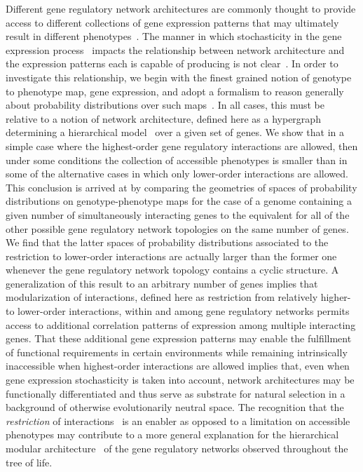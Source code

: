 Different gene regulatory network architectures are commonly thought to provide access to different collections of gene expression patterns that may ultimately result in different phenotypes~\cite{Alon2007}. The manner in which stochasticity in the gene expression process~\cite{Eldar2010,Sanchez2013} impacts the relationship between network architecture and the expression patterns each is capable of producing is not clear~\cite{Jothi2009,Chalancon2012}. In order to investigate this relationship, we begin with the finest grained notion of genotype to phenotype map, gene expression, and adopt a formalism to reason generally about probability distributions over such maps~\cite{Lane1998,MacLane1992,Awodey2006,Abramsky2011}. In all cases, this must be relative to a notion of network architecture, defined here as a hypergraph determining a hierarchical model~\cite{Lauritzen1996} over a given set of genes. We show that in a simple case where the highest-order gene regulatory interactions are allowed, then under some conditions the collection of accessible phenotypes is smaller than in some of the alternative cases in which only lower-order interactions are allowed. This conclusion is arrived at by comparing the geometries of spaces of probability distributions on genotype-phenotype maps for the case of a genome containing a given number of simultaneously interacting genes to the equivalent for all of the other possible gene regulatory network topologies on the same number of genes. We find that the latter spaces of probability distributions associated to the restriction to lower-order interactions are actually larger than the former one whenever the gene regulatory network topology contains a cyclic structure. A generalization of this result to an arbitrary number of genes implies that modularization of interactions, defined here as restriction from relatively higher- to lower-order interactions, within and among gene regulatory networks permits access to additional correlation patterns of expression among multiple interacting genes. That these additional gene expression patterns may enable the fulfillment of functional requirements in certain environments while remaining intrinsically inaccessible when highest-order interactions are allowed implies that, even when gene expression stochasticity is taken into account, network architectures may be functionally differentiated and thus serve as substrate for natural selection in a background of otherwise evolutionarily neutral space. The recognition that the \emph{restriction} of interactions~\cite{Bar-Even2006,Johnson2010a} is an enabler as opposed to a limitation on accessible phenotypes may contribute to a more general explanation for the hierarchical modular architecture~\cite{Ravasz2002,Segre2005,Wagner2007,Erwin2009,Jothi2009,Bhardwaj2010,Colm} of the gene regulatory networks observed throughout the tree of life.
